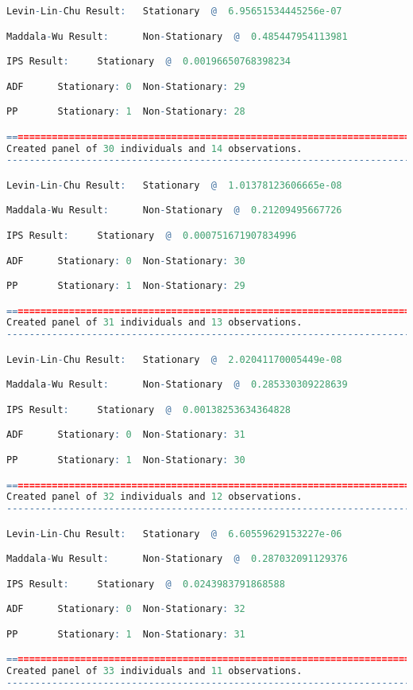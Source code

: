 \begin{lstlisting}[language=R]
Levin-Lin-Chu Result:   Stationary  @  6.95651534445256e-07

Maddala-Wu Result:      Non-Stationary  @  0.485447954113981

IPS Result:     Stationary  @  0.00196650768398234

ADF      Stationary: 0  Non-Stationary: 29

PP       Stationary: 1  Non-Stationary: 28

=========================================================================
Created panel of 30 individuals and 14 observations.
-------------------------------------------------------------------------

Levin-Lin-Chu Result:   Stationary  @  1.01378123606665e-08

Maddala-Wu Result:      Non-Stationary  @  0.21209495667726

IPS Result:     Stationary  @  0.000751671907834996

ADF      Stationary: 0  Non-Stationary: 30

PP       Stationary: 1  Non-Stationary: 29

=========================================================================
Created panel of 31 individuals and 13 observations.
-------------------------------------------------------------------------

Levin-Lin-Chu Result:   Stationary  @  2.02041170005449e-08

Maddala-Wu Result:      Non-Stationary  @  0.285330309228639

IPS Result:     Stationary  @  0.00138253634364828

ADF      Stationary: 0  Non-Stationary: 31

PP       Stationary: 1  Non-Stationary: 30

=========================================================================
Created panel of 32 individuals and 12 observations.
-------------------------------------------------------------------------

Levin-Lin-Chu Result:   Stationary  @  6.60559629153227e-06

Maddala-Wu Result:      Non-Stationary  @  0.287032091129376

IPS Result:     Stationary  @  0.0243983791868588

ADF      Stationary: 0  Non-Stationary: 32

PP       Stationary: 1  Non-Stationary: 31

=========================================================================
Created panel of 33 individuals and 11 observations.
-------------------------------------------------------------------------


\end{lstlisting}
